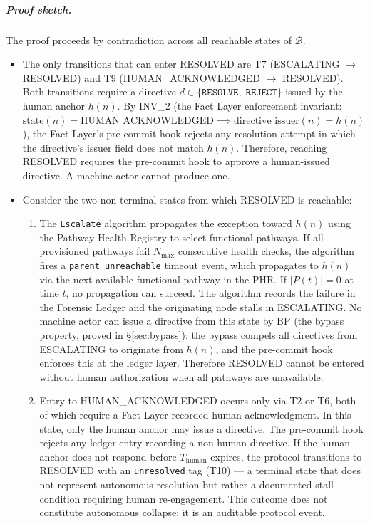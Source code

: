 \subparagraph{Proof sketch.} The proof proceeds by contradiction across all reachable states of $\mathcal{B}$.

\begin{itemize}
\item[\textbf{Step 1.}] The only transitions that can enter RESOLVED are T7 (ESCALATING $\rightarrow$ RESOLVED) and T9 (HUMAN\_ACKNOWLEDGED $\rightarrow$ RESOLVED). Both transitions require a directive $d \in \{\texttt{RESOLVE},\; \texttt{REJECT}\}$ issued by the human anchor $h(n)$. By INV\_2 (the Fact Layer enforcement invariant: $\text{state}(n) = \text{HUMAN\_ACKNOWLEDGED} \implies \text{directive\_issuer}(n) = h(n)$), the Fact Layer's pre-commit hook rejects any resolution attempt in which the directive's issuer field does not match $h(n)$. Therefore, reaching RESOLVED requires the pre-commit hook to approve a human-issued directive. A machine actor cannot produce one.

\item[\textbf{Step 2.}] Consider the two non-terminal states from which RESOLVED is reachable:

\begin{enumerate}
\item[\textbf{ESCALATING}:] The \texttt{Escalate} algorithm propagates the exception toward $h(n)$ using the Pathway Health Registry to select functional pathways. If all provisioned pathways fail $N_{\max}$ consecutive health checks, the algorithm fires a \texttt{parent\_unreachable} timeout event, which propagates to $h(n)$ via the next available functional pathway in the PHR. If $|P(t)| = 0$ at time $t$, no propagation can succeed. The algorithm records the failure in the Forensic Ledger and the originating node stalls in ESCALATING. No machine actor can issue a directive from this state by BP (the bypass property, proved in \S\ref{sec:bypass}): the bypass compels all directives from ESCALATING to originate from $h(n)$, and the pre-commit hook enforces this at the ledger layer. Therefore RESOLVED cannot be entered without human authorization when all pathways are unavailable.

\item[\textbf{HUMAN\_ACKNOWLEDGED}:] Entry to HUMAN\_ACKNOWLEDGED occurs only via T2 or T6, both of which require a Fact-Layer-recorded human acknowledgment. In this state, only the human anchor may issue a directive. The pre-commit hook rejects any ledger entry recording a non-human directive. If the human anchor does not respond before $T_{\text{human}}$ expires, the protocol transitions to RESOLVED with an \texttt{unresolved} tag (T10) --- a terminal state that does not represent autonomous resolution but rather a documented stall condition requiring human re-engagement. This outcome does not constitute autonomous collapse; it is an auditable protocol event.
\end{enumerate}


\end{itemize}
